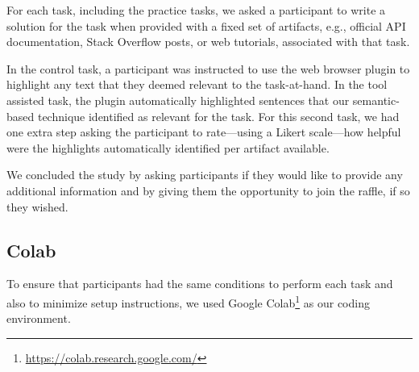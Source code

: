 {For each task, including the practice tasks, we asked a participant to write a solution for the task
when provided with a fixed set of artifacts, e.g., official API documentation, Stack Overflow posts, or web tutorials, 
associated with that task.  


In the control task, a participant was instructed to use the web browser plugin to highlight any text that they deemed relevant to the task-at-hand. 
In the tool assisted task, the plugin automatically highlighted sentences that our semantic-based technique identified as relevant for the task. 
For this second task, we had one extra step asking the participant to rate---using a Likert scale---how helpful were the highlights automatically identified per artifact available. 


We concluded the study by asking participants if they would like to provide any additional information and 
by giving them the opportunity to join the raffle, if so they wished. 











\subsection{Colab}
\label{cp6:environment}


To ensure that participants had the same conditions to perform each task
and also to minimize setup instructions, we used Google Colab\footnote{\url{https://colab.research.google.com/}} as our coding environment. 



}
